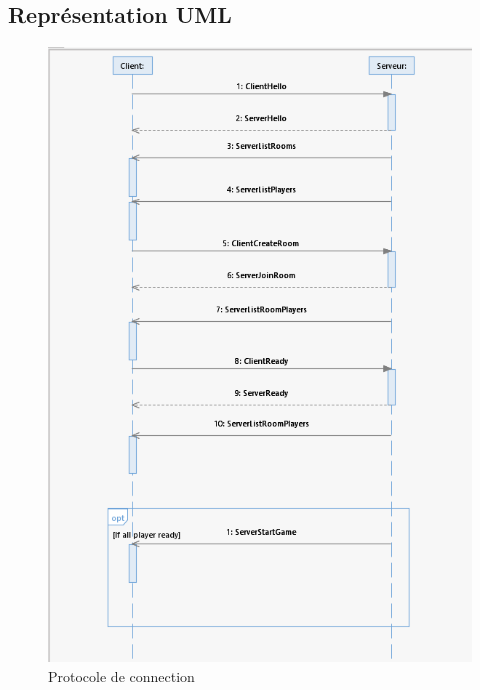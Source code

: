 \documentclass[a4paper, 12pt]{article}
\begin{document}
\subsection{Représentation UML}
\begin{figure}[H]
    \includegraphics[scale=0.6]{./Diagramme/Connection}
    \caption{Protocole de connection}
\end{figure}
\newpage
\end{document}
